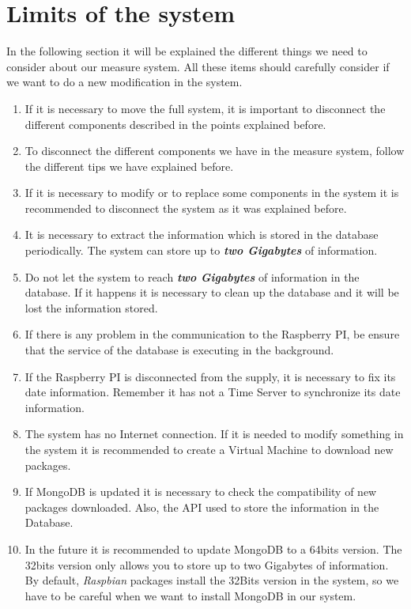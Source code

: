 \section{Limits of the system}

In the following section it will be explained the different things we need to consider about our measure system. All these items should carefully consider if we want to do a new modification in the system.

\begin{enumerate}

\item If it is necessary to move the full system, it is important to disconnect the different components described in the points explained before.

\item To disconnect the different components we have in the measure system, follow the different tips we have explained before.

\item If it is necessary to modify or to replace some components in the system it is recommended to disconnect the system as it was explained before.

\item It is necessary to extract the information which is stored in the database periodically. The system can store up to \textit{\textbf{two Gigabytes}} of information.

\item Do not let the system to reach \textit{\textbf{two Gigabytes}} of information in the database. If it happens it is necessary to clean up the database and it will be lost the information stored.

\item If there is any problem in the communication to the Raspberry PI, be ensure that the service of the database is executing in the background.

\item If the Raspberry PI is disconnected from the supply, it is necessary to fix its date information. Remember it has not a Time Server to synchronize its date information.

\item The system has no Internet connection. If it is needed to modify something in the system it is recommended to create a Virtual Machine to download new packages.

\item If MongoDB is updated it is necessary to check the compatibility of new packages downloaded. Also, the API used to store the information in the Database.

\item In the future it is recommended to update MongoDB to a 64bits version. The 32bits version only allows you to store up to two Gigabytes of information. By default, \textit{Raspbian} packages install the 32Bits version in the system, so we have to be careful when we want to install MongoDB in our system.

\end{enumerate}


